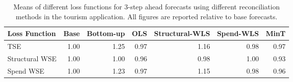 \begin{table}[ht]
\centering
\begin{tabular}{lrrrrrr}
  \hline
Loss Function & Base & Bottom-up & OLS & Structural-WLS & Spend-WLS & MinT \\ 
  \hline
TSE & 1.00 & 1.25 & 0.97 & 1.16 & 0.98 & 0.97 \\ 
  Structural WSE & 1.00 & 1.00 & 0.96 & 0.98 & 1.00 & 0.93 \\ 
  Spend WSE & 1.00 & 1.23 & 0.97 & 1.15 & 0.98 & 0.96 \\ 
   \hline
\end{tabular}
\caption{Means of different loss functions for 3-step ahead forecasts using different reconciliation methods in the tourism application.  All figures are reported relative to base forecasts.} 
\end{table}
